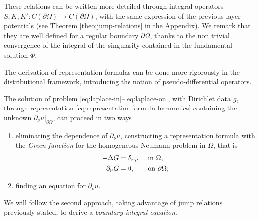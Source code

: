 \documentclass[10pt, a4paper, twoside, openright]{article}
\numberwithin{equation}{section}
\theoremstyle{definition}
\theoremstyle{plain}
\theoremstyle{plain}
\theoremstyle{plain}
\theoremstyle{plain}
\theoremstyle{plain}
\theoremstyle{plain}
\theoremstyle{plain}
\theoremstyle{plain}
\begin{document}
These relations can be written more detailed through integral operators 
$S, K, K': C(\partial \Omega)\to C(\partial \Omega)$, with the same expression
of the previous layer potentials (see Theorem \ref{theo:jump-relations} in the Appendix). 
We remark that they are well defined for a regular 
boundary $\partial\Omega$, thanks to the non trivial convergence of the integral of 
the singularity contained in the fundamental solution $\Phi$.
\par
The derivation of representation formulas can be done more rigorously in the 
distributional framework, introducing the notion of pseudo-differential operators.
\par
The solution of problem \eqref{eq:laplace-in}--\eqref{eq:laplace-on}, with Dirichlet data
$g$, through representation \eqref{eq:representation-formula-harmonics} containing 
the unknown $\partial_\nu u|_{\partial\Omega}$, can proceed in two ways
\begin{enumerate}
 \item eliminating the dependence of $\partial_\nu u$, constructing a representation
 formula with the \emph{Green function} for the homogeneous Neumann problem in $\Omega$, 
 that is
  \begin{alignat}{2}
  -\Delta G &= \delta_{z_0}, && \textup{ in }\Omega,\label{eq:green-neum-in}\\
  \partial_\nu G &= 0, && \textup{ on }\partial\Omega;\label{eq:green-neum-on}
  \end{alignat}
  \item finding an equation for $\partial_\nu u$. 
\end{enumerate}
We will follow the second approach, taking advantage of jump relations previously stated,
to derive a \emph{boundary integral equation}.
\appendix
\end{document}
